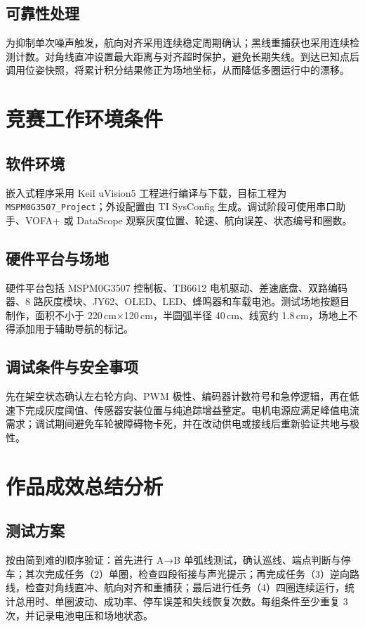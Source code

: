 \documentclass[12pt,a4paper,fontset=fandol]{ctexart}
\newcommand{\code}[1]{\texttt{\small #1}}
\begin{document}
\subsection{可靠性处理}
为抑制单次噪声触发，航向对齐采用连续稳定周期确认；黑线重捕获也采用连续检测计数。对角线直冲设置最大距离与对齐超时保护，避免长期失线。到达已知点后调用位姿快照，将累计积分结果修正为场地坐标，从而降低多圈运行中的漂移。

\section{竞赛工作环境条件}

\subsection{软件环境}
嵌入式程序采用 Keil uVision5 工程进行编译与下载，目标工程为 \code{MSPM0G3507\_Project}；外设配置由 TI SysConfig 生成。调试阶段可使用串口助手、VOFA+ 或 DataScope 观察灰度位置、轮速、航向误差、状态编号和圈数。

\subsection{硬件平台与场地}
硬件平台包括 MSPM0G3507 控制板、TB6612 电机驱动、差速底盘、双路编码器、8 路灰度模块、JY62、OLED、LED、蜂鸣器和车载电池。测试场地按题目制作，面积不小于 220\,cm×120\,cm，半圆弧半径 40\,cm、线宽约 1.8\,cm，场地上不得添加用于辅助导航的标记。

\subsection{调试条件与安全事项}
先在架空状态确认左右轮方向、PWM 极性、编码器计数符号和急停逻辑，再在低速下完成灰度阈值、传感器安装位置与纯追踪增益整定。电机电源应满足峰值电流需求；调试期间避免车轮被障碍物卡死，并在改动供电或接线后重新验证共地与极性。

\section{作品成效总结分析}

\subsection{测试方案}
按由简到难的顺序验证：首先进行 A→B 单弧线测试，确认巡线、端点判断与停车；其次完成任务（2）单圈，检查四段衔接与声光提示；再完成任务（3）逆向路线，检查对角线直冲、航向对齐和重捕获；最后进行任务（4）四圈连续运行，统计总用时、单圈波动、成功率、停车误差和失线恢复次数。每组条件至少重复 3 次，并记录电池电压和场地状态。
\end{document}
